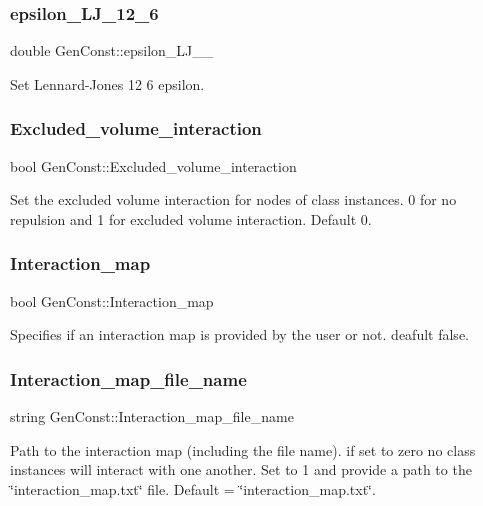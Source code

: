 \subsubsection{\texorpdfstring{epsilon\_LJ\_12\_6}{epsilon\_LJ\_12\_6}}
{\footnotesize\ttfamily double Gen\+Const\+::epsilon\+\_\+\+L\+J\+\_\+\_}

Set Lennard-\/\+Jones 12 6 epsilon. \mbox{\label{namespaceGenConst_a2a8e8f88c2959679b92fc79c94d07ad9}} 
\subsubsection{\texorpdfstring{Excluded\_volume\_interaction}{Excluded\_volume\_interaction}}
{\footnotesize\ttfamily bool Gen\+Const\+::\+Excluded\+\_\+volume\+\_\+interaction}

Set the excluded volume interaction for nodes of class instances. 0 for no repulsion and 1 for excluded volume interaction. Default 0. \mbox{\label{namespaceGenConst_ad847e6f5e498c18806f453d643ee8b1e}} 
\subsubsection{\texorpdfstring{Interaction\_map}{Interaction\_map}}
{\footnotesize\ttfamily bool Gen\+Const\+::\+Interaction\+\_\+map}

Specifies if an interaction map is provided by the user or not. deafult false. \mbox{\label{namespaceGenConst_a99a2fa8732b65ec4de1dfaca040a11de}} 
\subsubsection{\texorpdfstring{Interaction\_map\_file\_name}{Interaction\_map\_file\_name}}
{\footnotesize\ttfamily string Gen\+Const\+::\+Interaction\+\_\+map\+\_\+file\+\_\+name}

Path to the interaction map (including the file name). if set to zero no class instances will interact with one another. Set to 1 and provide a path to the \char`\"{}interaction\+\_\+map.\+txt\char`\"{} file. Default = \char`\"{}interaction\+\_\+map.\+txt\char`\"{}. \mbox{\label{namespaceGenConst_a80679742796064a242391cd8e3c067d0}} 
